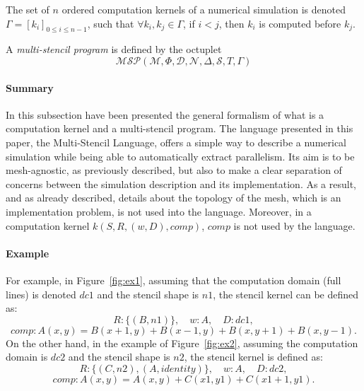 
\begin{mydef}
The set of $n$ ordered computation kernels of a numerical simulation is denoted $\Gamma = [k_i]_{0 \leq i \leq n-1}$, such that $\forall k_i,k_j \in \Gamma$, if $i < j$, then $k_i$ is computed before $k_j$.
\end{mydef}

\begin{mydef}
A \textit{multi-stencil program} is defined by the octuplet 
\begin{equation*}
\mathcal{MSP}(\mathcal{M},\Phi,\mathcal{D},\mathcal{N},\Delta, \mathcal{S},T,\Gamma)
\end{equation*}
\end{mydef}

\paragraph{\textbf{Summary}} In this subsection have been presented the general formalism of what is a computation kernel and a multi-stencil program. The language presented in this paper, the Multi-Stencil Language, offers a simple way to describe a numerical simulation while being able to automatically extract parallelism. Its aim is to be mesh-agnostic, as previously described, but also to make a clear separation of concerns between the simulation description and its implementation. As a result, and as already described, details about the topology of the mesh, which is an implementation problem, is not used into the language. Moreover, in a computation kernel $k(S,R,(w,D),comp)$, $comp$ is not used by the language.

\paragraph{\textbf{Example}}
For example, in Figure~\ref{fig:ex1}, assuming that the computation domain (full lines) is denoted $dc1$ and the stencil shape is $n1$, the stencil kernel can be defined as:
\begin{equation*}
R: \{(B,n1)\}, \quad w: A, \quad D: dc1,
\end{equation*}
\begin{equation*}
comp: A(x,y)=B(x+1,y)+B(x-1,y)+B(x,y+1)+B(x,y-1).
\end{equation*}
On the other hand, in the example of Figure~\ref{fig:ex2}, assuming the computation domain is $dc2$ and the stencil shape is $n2$, the stencil kernel is defined as:
\begin{equation*}
R: \{(C,n2),(A,identity)\}, \quad w: A, \quad D: dc2,
\end{equation*}
\begin{equation*}
comp: A(x,y)=A(x,y)+C(x1,y1)+C(x1+1,y1).
\end{equation*}

